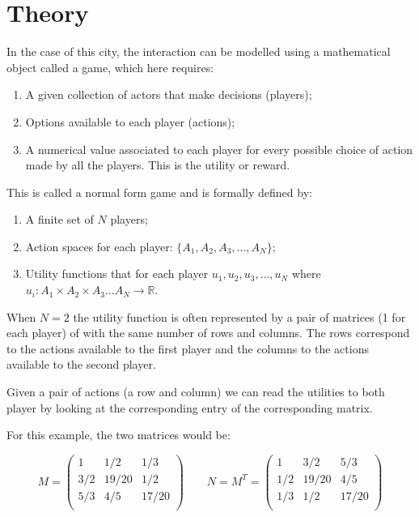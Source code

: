 \section{Theory}\label{sec:theory}

In the case of this city, the interaction can be modelled using a mathematical
object called a game, which here requires:

\begin{enumerate}
    \item A given collection of actors that make decisions (players);
    \item Options available to each player (actions);
    \item A numerical value associated to each player for every possible
        choice of action made by all the players. This is the utility or reward.
\end{enumerate}

This is called a normal form game and is formally defined by:

\begin{enumerate}
    \item A finite set of \(N\) players;
    \item Action spaces for each player: \(\{A_1, A_2, A_3, \dots, A_N\}\);
    \item Utility functions that for each player \(u_1, u_2, u_3, \dots, u_N\)
        where \(u_i:A_1\times A_2 \times A_3 \dots A_N \to \mathbb{R}\).
\end{enumerate}

When \(N=2\) the utility function is often represented by a pair of matrices (1
for each player) of with the same number of rows and columns. The rows
correspond to the actions available to the first player and the columns to the
actions available to the second player.

Given a pair of actions (a row and column) we can read the utilities to both
player by looking at the corresponding entry of the corresponding matrix.

For this example, the two matrices would be:

\[
   M =
        \begin{pmatrix}
            1     & 1 / 2   & 1 / 3 \\
            3 / 2 & 19 / 20 & 1 / 2 \\
            5 / 3 & 4 / 5   & 17 / 20\\
        \end{pmatrix}
   \qquad
   N = M ^T =
        \begin{pmatrix}
            1     & 3 / 2   & 5 / 3 \\
            1 / 2 & 19 / 20 & 4 / 5 \\
            1 / 3 & 1 / 2   & 17 / 20\\
        \end{pmatrix}
\]

